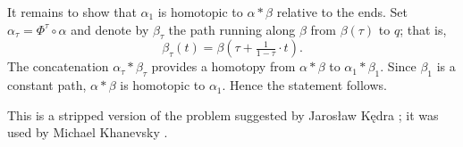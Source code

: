 It remains to show that $\alpha_1$ is homotopic to $\alpha*\beta$ relative to the ends.
Set $\alpha_\tau=\Phi^\tau\circ\alpha$ and denote by  $\beta_\tau$ the path running along $\beta$ from $\beta(\tau)$ to $q$;
that is, 
\[\beta_\tau(t)=\beta(\tau+\tfrac1{1-\tau}\cdot t).\]
The concatenation $\alpha_\tau*\beta_\tau$ provides a homotopy from $\alpha*\beta$ to $\alpha_1*\beta_1$. 
Since $\beta_1$ is a constant path, $\alpha*\beta$ is homotopic to $\alpha_1$.
Hence the statement follows.
\qeds

This is a stripped version of the problem suggested by Jaros{\l}aw K\k{e}dra \cite{One-step}; 
it was used by Michael Khanevsky \cite[Lemma 3 in][]{khanevsky}.
